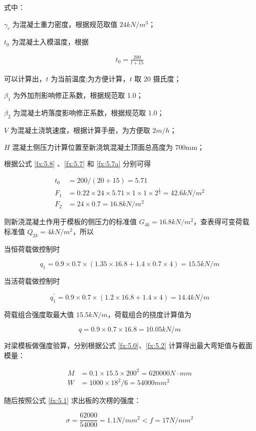式中：

$\gamma_c$ 为混凝土重力密度，根据规范取值 $24 kN/m^3$；

$t_0$ 为混凝土入模温度，根据

\begin{align}
\label{fx:5.8}
t_0=\frac{200}{t+15}
\end{align}

可以计算出，$t$ 为当前温度;为方便计算，$t$ 取 20 摄氏度；

$\beta_1$ 为外加剂影响修正系数，根据规范取 1.0；

$\beta_2$ 为混凝土坍落度影响修正系数，根据规范取 1.0；

$V$ 为混凝土浇筑速度，根据计算手册，为方便取 $2 m/h$；

$H$ 混凝土侧压力计算位置至新浇筑混凝土顶面总高度为 700mm；

根据公式 \ref{fx:5.8} 、\ref{fx:5.7} 和 \ref{fx:5.7a} 分别可得 

    \begin{align*}
        t_0&=200/(20+15)=5.71\\
        F_1&=0.22\times 24\times 5.71\times 1\times 1\times 2^{\frac{1}{2}}=42.6 kN/m^2\\
        F_2&=24\times 0.7=16.8 kN/m^2
    \end{align*}

则新浇混凝土作用于模板的侧压力的标准值 $G_{4k}=16.8 kN/m^2$，查表得可变荷载标准值 $Q_{2k}=4 kN/m^2$，所以

当恒荷载做控制时

\[
    q_1=0.9\times 0.7\times (1.35\times 16.8+1.4\times 0.7\times 4)=15.5 kN/m
\]

当活荷载做控制时

\[
    q_1^{'}=0.9\times 0.7\times (1.2\times 16.8+1.4\times 4)=14.4 kN/m
\]

荷载组合强度取最大值 $15.5 kN/m$，荷载组合的挠度计算值为

\[
    q=0.9\times 0.7\times 16.8=10.05 kN/m
\]

对梁模板做强度验算，分别根据公式 \ref{fx:5.0}、\ref{fx:5.2} 计算得出最大弯矩值与截面模量：

\begin{align*}
    M&=0.1\times 15.5\times 200^2=620000 N \cdot mm\\
    W&=1000\times 18^2 /6=54000 mm^2
\end{align*}

随后按照公式 \ref{fx:5.1} 求出板的次楞的强度：

\[
    \sigma = \frac{62000}{54000}=1.1 N/mm^2< f=17N/mm^2
\]

